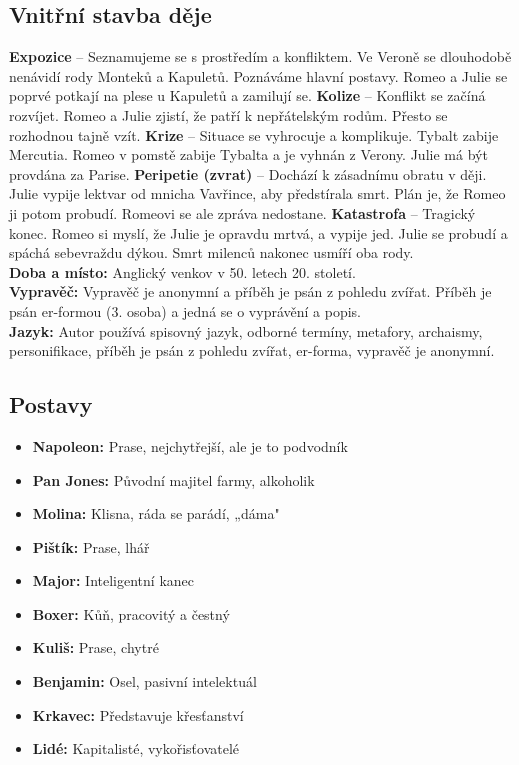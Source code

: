 \documentclass[12pt, a4paper]{article}
\newcommand{\mybf}[1]{\textcolor[RGB]{0, 179, 219}{\textbf{#1}}}
\begin{document}
\subsection*{Vnitřní stavba děje}
\noindent\textbf{Expozice} -- Seznamujeme se s prostředím a konfliktem. Ve Veroně se dlouhodobě nenávidí rody Monteků a Kapuletů. Poznáváme hlavní postavy. Romeo a Julie se poprvé potkají na plese u Kapuletů a zamilují se.
\noindent\textbf{Kolize} -- Konflikt se začíná rozvíjet. Romeo a Julie zjistí, že patří k nepřátelským rodům. Přesto se rozhodnou tajně vzít.
\noindent\textbf{Krize} -- Situace se vyhrocuje a komplikuje. Tybalt zabije Mercutia. Romeo v pomstě zabije Tybalta a je vyhnán z Verony. Julie má být provdána za Parise.
\noindent\textbf{Peripetie (zvrat)} -- Dochází k zásadnímu obratu v ději. Julie vypije lektvar od mnicha Vavřince, aby předstírala smrt. Plán je, že Romeo ji potom probudí. Romeovi se ale zpráva nedostane.
\noindent\textbf{Katastrofa} -- Tragický konec. Romeo si myslí, že Julie je opravdu mrtvá, a vypije jed. Julie se probudí a spáchá sebevraždu dýkou. Smrt milenců nakonec usmíří oba rody.\\[10pt]
\mybf{Doba a místo:} Anglický venkov v 50. letech 20. století.\\[10pt]
\mybf{Vypravěč:} Vypravěč je anonymní a příběh je psán z pohledu zvířat. Příběh je psán er-formou (3. osoba) a jedná se o vyprávění a popis.\\[10pt]
\mybf{Jazyk:} Autor používá spisovný jazyk, odborné termíny, metafory, archaismy, personifikace, příběh je psán z pohledu zvířat, er-forma, vypravěč je anonymní.

\subsection*{Postavy}
\begin{itemize}[itemsep=0.3em]
	\item \textbf{Napoleon:} Prase, nejchytřejší, ale je to podvodník
	\item \textbf{Pan Jones:} Původní majitel farmy, alkoholik
	\item \textbf{Molina:} Klisna, ráda se parádí, „dáma"
	\item \textbf{Pištík:} Prase, lhář
	\item \textbf{Major:} Inteligentní kanec
	\item \textbf{Boxer:} Kůň, pracovitý a čestný
	\item \textbf{Kuliš:} Prase, chytré
	\item \textbf{Benjamin:} Osel, pasivní intelektuál
	\item \textbf{Krkavec:} Představuje křesťanství
	\item \textbf{Lidé:} Kapitalisté, vykořisťovatelé
\end{itemize}
\end{document}
